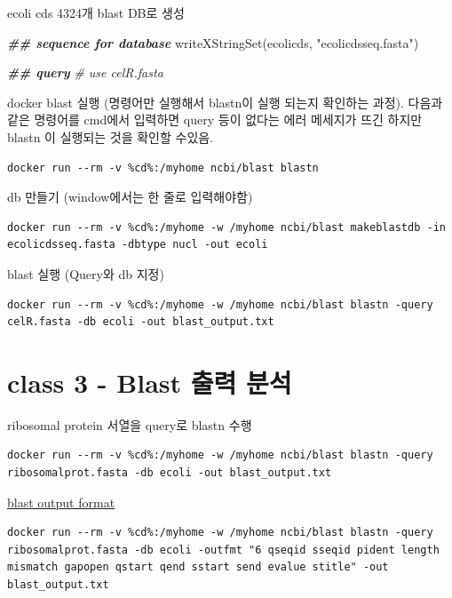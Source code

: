\documentclass[
]{book}
\newenvironment{Shaded}{\begin{snugshade}}{\end{snugshade}}
\newcommand{\CommentTok}[1]{\textcolor[rgb]{0.56,0.35,0.01}{\textit{#1}}}
\newcommand{\DocumentationTok}[1]{\textcolor[rgb]{0.56,0.35,0.01}{\textbf{\textit{#1}}}}
\newcommand{\FunctionTok}[1]{\textcolor[rgb]{0.00,0.00,0.00}{#1}}
\newcommand{\NormalTok}[1]{#1}
\newcommand{\StringTok}[1]{\textcolor[rgb]{0.31,0.60,0.02}{#1}}
\begin{document}
ecoli cds 4324개 blast DB로 생성

\begin{Shaded}
\begin{Highlighting}[]
\DocumentationTok{\#\# sequence for database}
\FunctionTok{writeXStringSet}\NormalTok{(ecolicds, }\StringTok{"ecolicdsseq.fasta"}\NormalTok{)}

\DocumentationTok{\#\# query }
\CommentTok{\# use celR.fasta}
\end{Highlighting}
\end{Shaded}

docker blast 실행 (명령어만 실행해서 blastn이 실행 되는지 확인하는 과정). 다음과 같은 명령어를 cmd에서 입력하면 query 등이 없다는 에러 메세지가 뜨긴 하지만 blastn 이 실행되는 것을 확인할 수있음.

\begin{verbatim}
docker run --rm -v %cd%:/myhome ncbi/blast blastn 
\end{verbatim}

db 만들기 (window에서는 한 줄로 입력해야함)

\begin{verbatim}
docker run --rm -v %cd%:/myhome -w /myhome ncbi/blast makeblastdb -in ecolicdsseq.fasta -dbtype nucl -out ecoli
\end{verbatim}

blast 실행 (Query와 db 지정)

\begin{verbatim}
docker run --rm -v %cd%:/myhome -w /myhome ncbi/blast blastn -query celR.fasta -db ecoli -out blast_output.txt
\end{verbatim}

\hypertarget{class-3---blast-uxcd9cuxb825-uxbd84uxc11d}{%
\section{class 3 - Blast 출력 분석}\label{class-3---blast-uxcd9cuxb825-uxbd84uxc11d}}

ribosomal protein 서열을 query로 blastn 수행

\begin{verbatim}
docker run --rm -v %cd%:/myhome -w /myhome ncbi/blast blastn -query ribosomalprot.fasta -db ecoli -out blast_output.txt
\end{verbatim}

\href{https://www.metagenomics.wiki/tools/blast/blastn-output-format-6}{blast output format}

\begin{verbatim}
docker run --rm -v %cd%:/myhome -w /myhome ncbi/blast blastn -query ribosomalprot.fasta -db ecoli -outfmt "6 qseqid sseqid pident length mismatch gapopen qstart qend sstart send evalue stitle" -out blast_output.txt
\end{verbatim}
\end{document}
